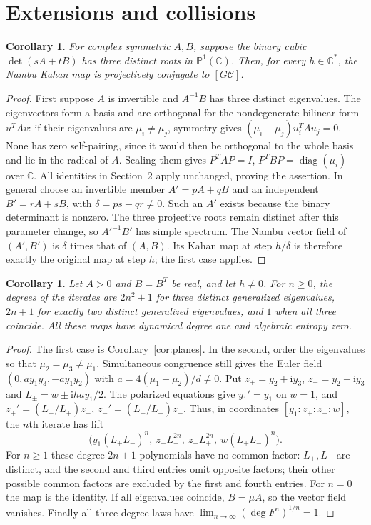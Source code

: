 \documentclass[11pt]{article}
\newtheorem{corollary}[theorem]{Corollary}
\newcommand{\C}{\mathbb C}
\newcommand{\diag}{\operatorname{diag}}
\newcommand{\Cr}{\mathcal C}
\begin{document}
\section{Extensions and collisions}
\begin{corollary}\label{cor:complex}
For complex symmetric $A,B$, suppose the binary cubic
$\det(sA+tB)$ has three distinct roots in $\mathbb P^1(\C)$.
Then, for every $h\in\C^*$, the Nambu Kahan map is projectively conjugate
to $[G\Cr]$.
\end{corollary}
\begin{proof}
First suppose $A$ is invertible and $A^{-1}B$ has three distinct eigenvalues.
The eigenvectors form a basis and are orthogonal for the nondegenerate
bilinear form $u^TAv$: if their eigenvalues are $\mu_i\ne\mu_j$, symmetry
gives $(\mu_i-\mu_j)u_i^T A u_j=0$.
None has zero self-pairing, since it would then be orthogonal to the whole
basis and lie in the radical of $A$. Scaling them gives
$P^TAP=I$, $P^TBP=\diag(\mu_i)$ over $\C$.
All identities in Section~2 apply unchanged, proving the assertion.
In general choose an invertible member $A'=pA+qB$ and an independent
$B'=rA+sB$, with $\delta=ps-qr\ne0$.
Such an $A'$ exists because the binary determinant is nonzero.
The three projective roots remain distinct after this parameter change, so
$A'^{-1}B'$ has simple spectrum. The Nambu vector field of $(A',B')$ is
$\delta$ times that of $(A,B)$. Its Kahan map at step $h/\delta$ is
therefore exactly the original map at step $h$; the first case applies.
\end{proof}

\begin{corollary}\label{cor:collision}
Let $A>0$ and $B=B^T$ be real, and let $h\ne0$. For $n\ge0$, the degrees
of the iterates are $2n^2+1$ for three distinct generalized eigenvalues,
$2n+1$ for exactly two distinct generalized eigenvalues, and $1$ when all
three coincide. All these maps have dynamical degree one and algebraic
entropy zero.
\end{corollary}
\begin{proof}
The first case is Corollary~\ref{cor:planes}. In the second, order the
eigenvalues so that $\mu_2=\mu_3\ne\mu_1$. Simultaneous congruence still
gives the Euler field $(0,a y_1y_3,-a y_1y_2)$ with
$a=4(\mu_1-\mu_2)/d\ne0$.
Put $z_+=y_2+\mathrm i y_3$, $z_-=y_2-\mathrm i y_3$ and
$L_\pm=w\pm \mathrm i h a y_1/2$.
The polarized equations give $y_1'=y_1$ on $w=1$, and
$z_+'=(L_-/L_+)z_+$, $z_-'=(L_+/L_-)z_-$.
Thus, in coordinates $[y_1:z_+:z_-:w]$, the $n$th iterate has lift
\[
 \bigl(y_1(L_+L_-)^n,\ z_+L_-^{2n},\ z_-L_+^{2n},\ w(L_+L_-)^n\bigr).
\]
For $n\ge1$ these degree-$2n+1$ polynomials have no common factor:
$L_+,L_-$ are distinct, and the second and third entries omit opposite
factors; their other possible common factors are excluded by the first
and fourth entries. For $n=0$ the map is the identity.
If all eigenvalues coincide, $B=\mu A$, so the vector field vanishes.
Finally all three degree laws have $\lim_{n\to\infty}(\deg F^n)^{1/n}=1$.
\end{proof}
\end{document}
